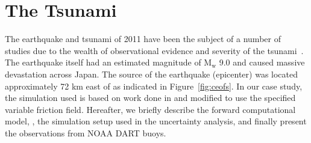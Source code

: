 
\section{The \tohoku Tsunami} 
\label{sec:tohoku}

The \tohoku earthquake and tsunami of 2011 have been the subject of a number of
studies due to the wealth of observational evidence and severity of the tsunami~\cite{Kawase2014}.
The earthquake itself had an estimated magnitude of $\text{M}_\text{w}$ 9.0 and
caused massive devastation across Japan. The source of the earthquake (epicenter)
was located approximately 72 km east of \tohoku as indicated 
in Figure~\ref{fig:ceofs}. In our case study, the
simulation used is based on work done in \cite{MacInnes:2013cr} and modified to 
use the specified variable friction field. Hereafter, we briefly describe the
forward computational model, \geoclaw, the  simulation setup used in the
uncertainty analysis, and finally present the observations from NOAA DART buoys.


